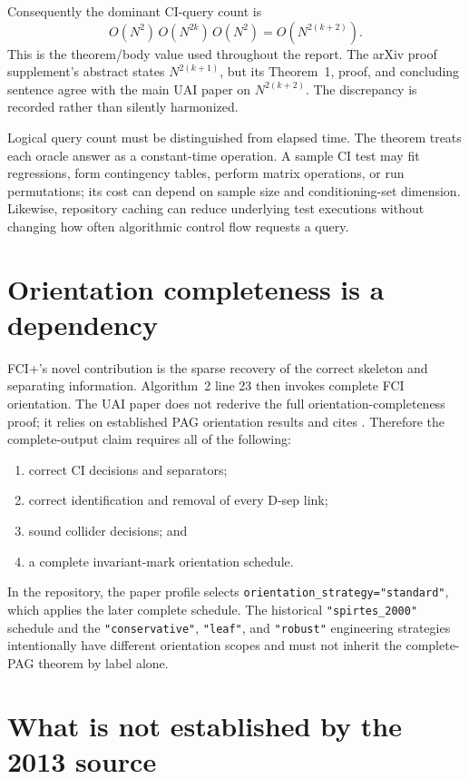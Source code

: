 \documentclass[11pt,a4paper,oneside]{report}
\newcommand{\code}[1]{\texttt{#1}}
\begin{document}
Consequently the dominant CI-query count is
\[
  O(N^2)\,O(N^{2k})\,O(N^2)
    = O\!\left(N^{2(k+2)}\right).
\]
This is the theorem/body value used throughout the report.  The arXiv proof
supplement's abstract states \(N^{2(k+1)}\), but its Theorem~1, proof, and
concluding sentence agree with the main UAI paper on \(N^{2(k+2)}\).  The
discrepancy is recorded rather than silently harmonized.

Logical query count must be distinguished from elapsed time.  The theorem
treats each oracle answer as a constant-time operation.  A sample CI test may
fit regressions, form contingency tables, perform matrix operations, or run
permutations; its cost can depend on sample size and conditioning-set
dimension.  Likewise, repository caching can reduce underlying test
executions without changing how often algorithmic control flow requests a
query.

\section{Orientation completeness is a dependency}

FCI+'s novel contribution is the sparse recovery of the correct skeleton and
separating information.  Algorithm~2 line 23 then invokes complete FCI
orientation.  The UAI paper does not rederive the full orientation-completeness
proof; it relies on established PAG orientation results and cites
\citet{zhang2008completeness}.  Therefore the complete-output claim requires
all of the following:

\begin{enumerate}[leftmargin=2em]
  \item correct CI decisions and separators;
  \item correct identification and removal of every D-sep link;
  \item sound collider decisions; and
  \item a complete invariant-mark orientation schedule.
\end{enumerate}

In the repository, the paper profile selects
\code{orientation\_strategy="standard"}, which applies the later complete
schedule.  The historical \code{"spirtes\_2000"} schedule and the
\code{"conservative"}, \code{"leaf"}, and \code{"robust"} engineering
strategies intentionally have different orientation scopes and must not
inherit the complete-PAG theorem by label alone.

\section{What is not established by the 2013 source}
\label{sec:fciplus-not-established}
\end{document}
